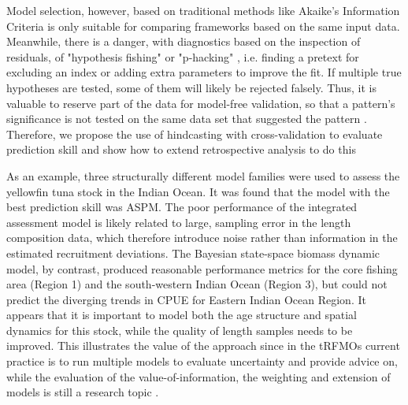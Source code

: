 \documentclass[12pt,halfline,a4paper,nonumbib]{ouparticle}
\begin{document}
Model selection, however, based on traditional methods like Akaike’s Information Criteria  \parencite[AIC,][]{akaike1998information} is only suitable for comparing frameworks based on the same input data. Meanwhile, there is a danger, with diagnostics based on the inspection of residuals, of "hypothesis fishing" or "p-hacking" \parencite{wasserstein2016asa,head2015extent}, i.e. finding a pretext for excluding an index or adding extra parameters \parencite[e.g.][]{schirripa2017hypothesis} to improve the fit. If multiple true hypotheses are tested, some of them will likely be rejected falsely. Thus, it is valuable to reserve part of the data for model-free validation, so that a pattern’s significance is not tested on the same data set that suggested the pattern \parencite{arlot2010survey}. Therefore, we propose the use of hindcasting with cross-validation to evaluate prediction skill and show how to extend retrospective analysis to do this

As an example, three structurally different model families were used to assess the yellowfin tuna stock in the Indian Ocean. It was found that the model with the best prediction skill was ASPM. The poor performance of the integrated assessment model is likely related to large, sampling error in the length composition data, which therefore introduce noise rather than information in the estimated recruitment deviations. The Bayesian state-space biomass dynamic model, by contrast, produced reasonable performance metrics for the core fishing area (Region 1) and the south-western Indian Ocean (Region 3), but could not predict the diverging trends in CPUE for Eastern Indian Ocean Region. It appears that it is important to model both the age structure and spatial dynamics for this stock, while the quality of length samples needs to be improved. This illustrates the value of the approach since in the tRFMOs current practice is to run multiple models to evaluate uncertainty and provide advice on, while the evaluation of the value-of-information, the weighting and extension of models is still a research topic \cite{kell2016quantification}. 
\end{document}
